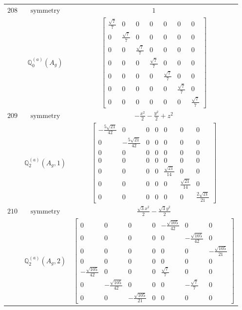 \documentclass[fleqn,8pt,landscape]{jsarticle}
\begin{document}
\begin{longtable}{ccc}
$ 208 $ & $ \text{symmetry} $ & $ 1 $ \\
$  $ & $ \mathbb{Q}_{0}^{(a)}(A_{g}) $ & $ \begin{bmatrix} \frac{\sqrt{7}}{7} & 0 & 0 & 0 & 0 & 0 & 0 \\ 0 & \frac{\sqrt{7}}{7} & 0 & 0 & 0 & 0 & 0 \\ 0 & 0 & \frac{\sqrt{7}}{7} & 0 & 0 & 0 & 0 \\ 0 & 0 & 0 & \frac{\sqrt{7}}{7} & 0 & 0 & 0 \\ 0 & 0 & 0 & 0 & \frac{\sqrt{7}}{7} & 0 & 0 \\ 0 & 0 & 0 & 0 & 0 & \frac{\sqrt{7}}{7} & 0 \\ 0 & 0 & 0 & 0 & 0 & 0 & \frac{\sqrt{7}}{7} \end{bmatrix} $ \\ \hline
$ 209 $ & $ \text{symmetry} $ & $ - \frac{x^{2}}{2} - \frac{y^{2}}{2} + z^{2} $ \\
$  $ & $ \mathbb{Q}_{2}^{(a)}(A_{g},1) $ & $ \begin{bmatrix} - \frac{5 \sqrt{21}}{42} & 0 & 0 & 0 & 0 & 0 & 0 \\ 0 & - \frac{5 \sqrt{21}}{42} & 0 & 0 & 0 & 0 & 0 \\ 0 & 0 & 0 & 0 & 0 & 0 & 0 \\ 0 & 0 & 0 & 0 & 0 & 0 & 0 \\ 0 & 0 & 0 & 0 & \frac{\sqrt{21}}{14} & 0 & 0 \\ 0 & 0 & 0 & 0 & 0 & \frac{\sqrt{21}}{14} & 0 \\ 0 & 0 & 0 & 0 & 0 & 0 & \frac{2 \sqrt{21}}{21} \end{bmatrix} $ \\ \hline
$ 210 $ & $ \text{symmetry} $ & $ \frac{\sqrt{3} x^{2}}{2} - \frac{\sqrt{3} y^{2}}{2} $ \\
$  $ & $ \mathbb{Q}_{2}^{(a)}(A_{g},2) $ & $ \begin{bmatrix} 0 & 0 & 0 & 0 & - \frac{\sqrt{105}}{42} & 0 & 0 \\ 0 & 0 & 0 & 0 & 0 & - \frac{\sqrt{105}}{42} & 0 \\ 0 & 0 & 0 & 0 & 0 & 0 & - \frac{\sqrt{105}}{21} \\ 0 & 0 & 0 & 0 & 0 & 0 & 0 \\ - \frac{\sqrt{105}}{42} & 0 & 0 & 0 & \frac{\sqrt{7}}{7} & 0 & 0 \\ 0 & - \frac{\sqrt{105}}{42} & 0 & 0 & 0 & - \frac{\sqrt{7}}{7} & 0 \\ 0 & 0 & - \frac{\sqrt{105}}{21} & 0 & 0 & 0 & 0 \end{bmatrix} $ \\ \hline

\end{longtable}
\end{document}
